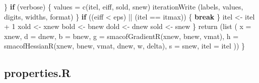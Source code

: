 \documentclass[
  12pt,
]{book}
\newenvironment{Shaded}{\begin{snugshade}}{\end{snugshade}}
\newcommand{\AttributeTok}[1]{\textcolor[rgb]{0.77,0.63,0.00}{#1}}
\newcommand{\ControlFlowTok}[1]{\textcolor[rgb]{0.13,0.29,0.53}{\textbf{#1}}}
\newcommand{\DecValTok}[1]{\textcolor[rgb]{0.00,0.00,0.81}{#1}}
\newcommand{\FunctionTok}[1]{\textcolor[rgb]{0.00,0.00,0.00}{#1}}
\newcommand{\NormalTok}[1]{#1}
\newcommand{\OtherTok}[1]{\textcolor[rgb]{0.56,0.35,0.01}{#1}}
\newcommand{\SpecialCharTok}[1]{\textcolor[rgb]{0.00,0.00,0.00}{#1}}
\theoremstyle{definition}
\theoremstyle{definition}
\theoremstyle{definition}
\theoremstyle{definition}
\theoremstyle{remark}
\begin{document}
\begin{Shaded}
\begin{Highlighting}[]
\NormalTok{      \}}
      \ControlFlowTok{if}\NormalTok{ (verbose) \{}
\NormalTok{        values }\OtherTok{=} \FunctionTok{c}\NormalTok{(itel, eiff, sold, snew)}
        \FunctionTok{iterationWrite}\NormalTok{ (labels, values, digits, widths, format)}
\NormalTok{      \}}
       \ControlFlowTok{if}\NormalTok{ ((eiff }\SpecialCharTok{\textless{}}\NormalTok{ eps) }\SpecialCharTok{||}\NormalTok{ (itel }\SpecialCharTok{==}\NormalTok{ itmax)) \{}
        \ControlFlowTok{break}
\NormalTok{      \}}
\NormalTok{      itel }\OtherTok{\textless{}{-}}\NormalTok{ itel }\SpecialCharTok{+} \DecValTok{1}
\NormalTok{      xold }\OtherTok{\textless{}{-}}\NormalTok{ xnew}
\NormalTok{      bold }\OtherTok{\textless{}{-}}\NormalTok{ bnew}
\NormalTok{      dold }\OtherTok{\textless{}{-}}\NormalTok{ dnew}
\NormalTok{      sold }\OtherTok{\textless{}{-}}\NormalTok{ snew}
\NormalTok{    \}}
    \FunctionTok{return}\NormalTok{ (}\FunctionTok{list}\NormalTok{ (}
      \AttributeTok{x =}\NormalTok{ xnew,}
      \AttributeTok{d =}\NormalTok{ dnew,}
      \AttributeTok{b =}\NormalTok{ bnew,}
      \AttributeTok{g =} \FunctionTok{smacofGradientR}\NormalTok{(xnew, bnew, vmat),}
      \AttributeTok{h =} \FunctionTok{smacofHessianR}\NormalTok{(xnew, bnew, vmat, dnew, w, delta),}
      \AttributeTok{s =}\NormalTok{ snew,}
      \AttributeTok{itel =}\NormalTok{ itel}
\NormalTok{    ))}
\NormalTok{  \}}
\end{Highlighting}
\end{Shaded}

\hypertarget{apcodeprop}{%
\subsection{properties.R}\label{apcodeprop}}
\end{document}
